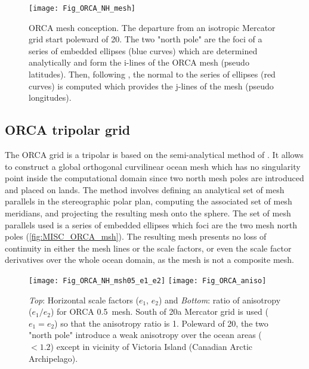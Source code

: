 \documentclass[../main/NEMO_manual]{subfiles}
\begin{document}
\begin{figure}[!t]
  \begin{center}
    \texttt{[image: Fig\_ORCA\_NH\_mesh]}
    \caption{
      \protect\label{fig:MISC_ORCA_msh}
      ORCA mesh conception.
      The departure from an isotropic Mercator grid start poleward of 20\degN.
      The two "north pole" are the foci of a series of embedded ellipses (blue curves) which
      are determined analytically and form the i-lines of the ORCA mesh (pseudo latitudes).
      Then, following \citet{Madec_Imbard_CD96}, the normal to the series of ellipses (red curves) is computed which
      provides the j-lines of the mesh (pseudo longitudes).
    }
  \end{center}
\end{figure}

\subsection{ORCA tripolar grid}
\label{subsec:CFG_orca_grid}

The ORCA grid is a tripolar is based on the semi-analytical method of \citet{Madec_Imbard_CD96}.
It allows to construct a global orthogonal curvilinear ocean mesh which has no singularity point inside
the computational domain since two north mesh poles are introduced and placed on lands.
The method involves defining an analytical set of mesh parallels in the stereographic polar plan,
computing the associated set of mesh meridians, and projecting the resulting mesh onto the sphere.
The set of mesh parallels used is a series of embedded ellipses which foci are the two mesh north poles
(\autoref{fig:MISC_ORCA_msh}).
The resulting mesh presents no loss of continuity in either the mesh lines or the scale factors,
or even the scale factor derivatives over the whole ocean domain, as the mesh is not a composite mesh. 
\begin{figure}[!tbp]
  \begin{center}
    \texttt{[image: Fig\_ORCA\_NH\_msh05\_e1\_e2]}
    \texttt{[image: Fig\_ORCA\_aniso]}
    \caption {
      \protect\label{fig:MISC_ORCA_e1e2}
      \textit{Top}: Horizontal scale factors ($e_1$, $e_2$) and
      \textit{Bottom}: ratio of anisotropy ($e_1 / e_2$)
      for ORCA 0.5\deg ~mesh.
      South of 20\degN a Mercator grid is used ($e_1 = e_2$) so that the anisotropy ratio is 1.
      Poleward of 20\degN, the two "north pole" introduce a weak anisotropy over the ocean areas ($< 1.2$) except in
      vicinity of Victoria Island (Canadian Arctic Archipelago).
    }
  \end{center}
\end{figure}
\end{document}
